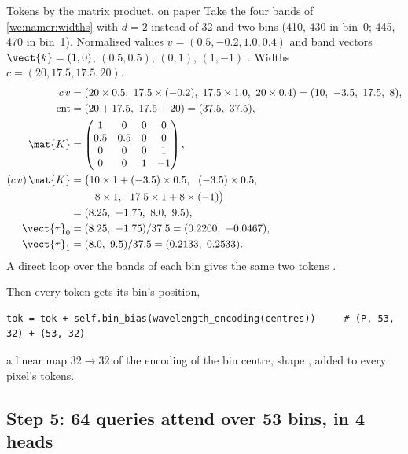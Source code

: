 \begin{worked}[label={we:namer:kmat}]{Tokens by the matrix product, on paper}
Take the four bands of \cref{we:namer:widths} with $d=2$ instead of 32 and two bins (410, 430 in bin~0; 445, 470 in
bin~1). Normalised values $v=(0.5,-0.2,1.0,0.4)$ and band vectors $\vect{k}=(1,0)$, $(0.5,0.5)$, $(0,1)$, $(1,-1)$
\tagA. Widths $c=(20,17.5,17.5,20)$.
\begin{align*}
c\,v &= (20\times0.5,\ 17.5\times(-0.2),\ 17.5\times1.0,\ 20\times0.4) = (10,\ -3.5,\ 17.5,\ 8),\\
\text{cnt} &= (20+17.5,\ 17.5+20) = (37.5,\ 37.5),\\
\mat{K} &= \begin{pmatrix}1&0&0&0\\0.5&0.5&0&0\\0&0&0&1\\0&0&1&-1\end{pmatrix},\\
(c\,v)\,\mat{K} &= \big(10\times1+(-3.5)\times0.5,\ \ (-3.5)\times0.5,\\
&\qquad\ 8\times1,\ \ 17.5\times1+8\times(-1)\big)\\
&= (8.25,\ -1.75,\ 8.0,\ 9.5),\\
\vect{\tau}_0 &= (8.25,\ -1.75)/37.5 = (0.2200,\ -0.0467),\\
\vect{\tau}_1 &= (8.0,\ 9.5)/37.5 = (0.2133,\ 0.2533).
\end{align*}
A direct loop over the bands of each bin gives the same two tokens \tagC.
\end{worked}

Then every token gets its bin's position,
\begin{lstlisting}
tok = tok + self.bin_bias(wavelength_encoding(centres))     # (P, 53, 32) + (53, 32)
\end{lstlisting}
a linear map $32\to32$ of the encoding of the bin centre, shape , added to every pixel's tokens.

\subsection{Step 5: 64 queries attend over 53 bins, in 4 heads}


